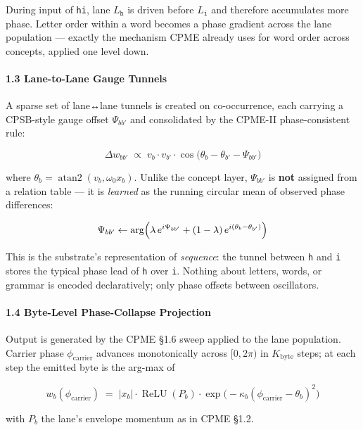 \documentclass[
  11pt,
  a4paper,
]{article}
\begin{document}
During input of \texttt{hi}, lane \(L_{\texttt{h}}\) is driven before
\(L_{\texttt{i}}\) and therefore accumulates more phase. Letter order
within a word becomes a phase gradient across the lane population ---
exactly the mechanism CPME already uses for word order across concepts,
applied one level down.

\paragraph{1.3 Lane-to-Lane Gauge
Tunnels}\label{lane-to-lane-gauge-tunnels}

A sparse set of lane↔lane tunnels is created on co-occurrence, each
carrying a CPSB-style gauge offset \(\Psi_{bb'}\) and consolidated by
the CPME-II phase-consistent rule:

\[ \Delta w_{bb'} \;\propto\; v_b \cdot v_{b'} \cdot \cos\!\bigl(\theta_b - \theta_{b'} - \Psi_{bb'}\bigr) \]

where \(\theta_b = \operatorname{atan2}(v_b, \omega_0 x_b)\). Unlike the
concept layer, \(\Psi_{bb'}\) is \textbf{not} assigned from a relation
table --- it is \emph{learned} as the running circular mean of observed
phase differences:

\[ \Psi_{bb'} \leftarrow \arg\Bigl( \lambda\, e^{i\Psi_{bb'}} + (1-\lambda)\, e^{i(\theta_b - \theta_{b'})} \Bigr) \]

This is the substrate's representation of \emph{sequence}: the tunnel
between \texttt{h} and \texttt{i} stores the typical phase lead of
\texttt{h} over \texttt{i}. Nothing about letters, words, or grammar is
encoded declaratively; only phase offsets between oscillators.

\paragraph{1.4 Byte-Level Phase-Collapse
Projection}\label{byte-level-phase-collapse-projection}

Output is generated by the CPME §1.6 sweep applied to the lane
population. Carrier phase \(\phi_{\text{carrier}}\) advances
monotonically across \([0, 2\pi)\) in \(K_{\text{byte}}\) steps; at each
step the emitted byte is the arg-max of

\[ w_b(\phi_{\text{carrier}}) \;=\; |x_b| \cdot \operatorname{ReLU}(P_b) \cdot \exp\!\bigl(-\kappa_b (\phi_{\text{carrier}} - \theta_b)^2\bigr) \]

with \(P_b\) the lane's envelope momentum as in CPME §1.2.
\end{document}
